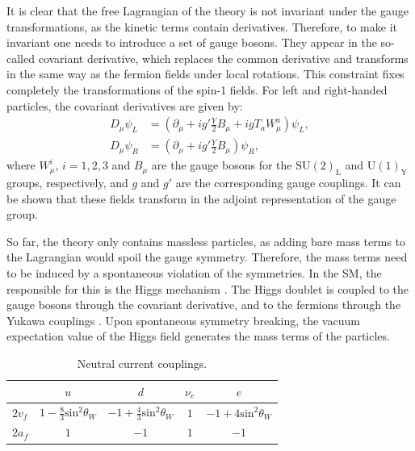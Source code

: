 It is clear that the free Lagrangian of the theory is not invariant under the gauge transformations, as the kinetic terms contain derivatives. Therefore, to make it invariant one needs to introduce a set of gauge bosons. They appear in the so-called covariant derivative, which replaces the common derivative and transforms in the same way as the fermion fields under local rotations. This constraint fixes completely the transformations of the spin-1 fields. For left and right-handed particles, the covariant derivatives are given by:
\begin{equation}
	\begin{split}
		D_{\mu} \psi_{L} &= \left(\partial_{\mu} + ig'\frac{Y}{2}B_{\mu}+igT_{a}W^{a}_{\mu}\right)\psi_{L},\\
		D_{\mu} \psi_{R} &= \left(\partial_{\mu} + ig'\frac{Y}{2}B_{\mu}\right)\psi_{R},
	\end{split}
\end{equation}
where $W^{i}_{\mu}$, $i=1,2,3$ and $B_{\mu}$ are the gauge bosons for the $\mathrm{SU}(2)_{\mathrm{L}}$ and $\mathrm{U}(1)_{\mathrm{Y}}$ groups, respectively, and $g$ and $g'$ are the corresponding gauge couplings. It can be shown that these fields transform in the adjoint representation of the gauge group.

So far, the theory only contains massless particles, as adding bare mass terms to the Lagrangian would spoil the gauge symmetry. Therefore, the mass terms need to be induced by a spontaneous violation of the symmetries. In the SM, the responsible for this is the Higgs mechanism \cite{Englert1964,Higgs1964,Guralnik1964}. The Higgs doublet is coupled to the gauge bosons through the covariant derivative, and to the fermions through the Yukawa couplings \cite{Pich2012}. Upon spontaneous symmetry breaking, the vacuum expectation value of the Higgs field generates the mass terms of the particles.

\begin{table}[t]
	\centering
	\caption{Neutral current couplings.}
			\begin{tabular}{l|cccc}
					& $u$                                       & $d$                                        & $\nu_{e}$ & $e$                              \\[2mm] \hline
			\rule{0pt}{1.1\normalbaselineskip}$2v_{f}$ & $1-\frac{8}{3}\mathrm{sin}^{2}\theta_{W}$ & $-1+\frac{4}{3}\mathrm{sin}^{2}\theta_{W}$ & $1$       & $-1+4\mathrm{sin}^{2}\theta_{W}$ \\[2mm]
			$2a_{f}$ & $1$                                       & $-1$                                       & $1$       & $-1$                            
		\end{tabular}
	\label{tab:sm_nc_couplings}
\end{table}

